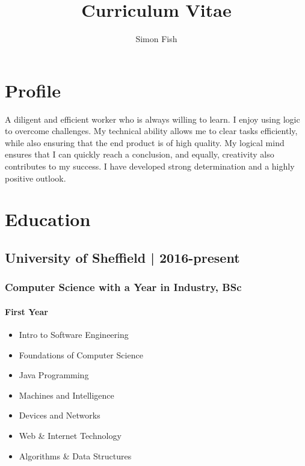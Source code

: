 \documentclass{article}
\begin{document}
\title{Curriculum Vitae}
\author{Simon Fish}

\maketitle

\section*{Profile}
A diligent and efficient worker who is always willing to learn. I enjoy using logic to
overcome challenges. My technical ability allows me to clear tasks efficiently,
while also ensuring that the end product is of high quality. My logical mind
ensures that I can quickly reach a conclusion, and equally, creativity also
contributes to my success. I have developed strong determination and a highly
positive outlook.

\section*{Education}
\subsection*{University of Sheffield | 2016-present}
\subsubsection*{Computer Science with a Year in Industry, BSc}
\paragraph{First Year}
\begin{itemize}
  \item Intro to Software Engineering
  \item Foundations of Computer Science
  \item Java Programming
  \item Machines and Intelligence
  \item Devices and Networks
  \item Web \& Internet Technology
  \item Algorithms \& Data Structures
\end{itemize}
\end{document}
